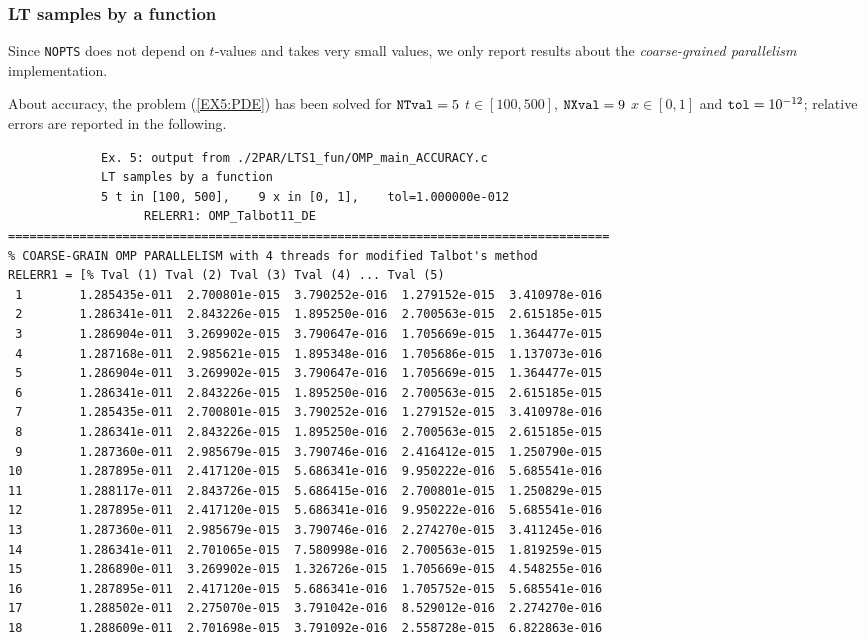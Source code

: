 \documentclass[a4paper,10pt]{report}%
\begin{document}
\subsubsection{LT samples by a function}
Since {\tt NOPTS} does not depend on $t$-values and takes very small values, we only report results about the
{\em coarse-grained parallelism} implementation.

About accuracy, the problem (\ref{EX5:PDE}) has been solved for ${\tt NTval}=5$ $t\in[100, 500]$,
${\tt NXval}=9$ $x\in[0,1]$ and ${\tt tol}=10^{-12}$; relative errors are reported in the following.
\begin{lstlisting}
             Ex. 5: output from ./2PAR/LTS1_fun/OMP_main_ACCURACY.c
             LT samples by a function
             5 t in [100, 500],    9 x in [0, 1],    tol=1.000000e-012
                   RELERR1: OMP_Talbot11_DE
====================================================================================
% COARSE-GRAIN OMP PARALLELISM with 4 threads for modified Talbot's method
RELERR1 = [% Tval (1) Tval (2) Tval (3) Tval (4) ... Tval (5)
 1        1.285435e-011  2.700801e-015  3.790252e-016  1.279152e-015  3.410978e-016
 2        1.286341e-011  2.843226e-015  1.895250e-016  2.700563e-015  2.615185e-015
 3        1.286904e-011  3.269902e-015  3.790647e-016  1.705669e-015  1.364477e-015
 4        1.287168e-011  2.985621e-015  1.895348e-016  1.705686e-015  1.137073e-016
 5        1.286904e-011  3.269902e-015  3.790647e-016  1.705669e-015  1.364477e-015
 6        1.286341e-011  2.843226e-015  1.895250e-016  2.700563e-015  2.615185e-015
 7        1.285435e-011  2.700801e-015  3.790252e-016  1.279152e-015  3.410978e-016
 8        1.286341e-011  2.843226e-015  1.895250e-016  2.700563e-015  2.615185e-015
 9        1.287360e-011  2.985679e-015  3.790746e-016  2.416412e-015  1.250790e-015
10        1.287895e-011  2.417120e-015  5.686341e-016  9.950222e-016  5.685541e-016
11        1.288117e-011  2.843726e-015  5.686415e-016  2.700801e-015  1.250829e-015
12        1.287895e-011  2.417120e-015  5.686341e-016  9.950222e-016  5.685541e-016
13        1.287360e-011  2.985679e-015  3.790746e-016  2.274270e-015  3.411245e-016
14        1.286341e-011  2.701065e-015  7.580998e-016  2.700563e-015  1.819259e-015
15        1.286890e-011  3.269902e-015  1.326726e-015  1.705669e-015  4.548255e-016
16        1.287895e-011  2.417120e-015  5.686341e-016  1.705752e-015  5.685541e-016
17        1.288502e-011  2.275070e-015  3.791042e-016  8.529012e-016  2.274270e-016
18        1.288609e-011  2.701698e-015  3.791092e-016  2.558728e-015  6.822863e-016

\end{lstlisting}
\end{document}

